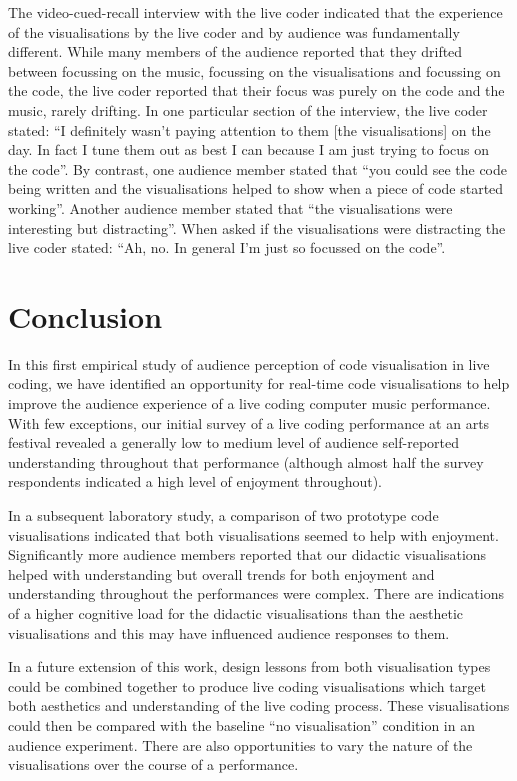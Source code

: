 \documentclass{sig-alternate}
\begin{document}
The video-cued-recall interview with the live coder indicated that the
experience of the visualisations by the live coder and by audience was
fundamentally different. While many members of the audience reported
that they drifted between focussing on the music, focussing on the
visualisations and focussing on the code, the live coder reported that
their focus was purely on the code and the music, rarely drifting. In
one particular section of the interview, the live coder stated: ``I
definitely wasn't paying attention to them [the visualisations] on the
day. In fact I tune them out as best I can because I am just trying to
focus on the code''. By contrast, one audience member stated that
``you could see the code being written and the visualisations helped
to show when a piece of code started working''. Another audience
member stated that ``the visualisations were interesting but
distracting''. When asked if the visualisations were distracting the
live coder stated: ``Ah, no. In general I'm just so focussed on the
code''.

\section{Conclusion}

In this first empirical study of audience perception of code
visualisation in live coding, we have identified an opportunity for
real-time code visualisations to help improve the audience experience
of a live coding computer music performance. With few exceptions, our
initial survey of a live coding performance at an arts festival
revealed a generally low to medium level of audience self-reported
understanding throughout that performance (although almost half the
survey respondents indicated a high level of enjoyment throughout).

In a subsequent laboratory study, a comparison of two prototype code
visualisations indicated that both visualisations seemed to help with
enjoyment. Significantly more audience members reported that our
didactic visualisations helped with understanding but overall trends
for both enjoyment and understanding throughout the performances were
complex. There are indications of a higher cognitive load for the
didactic visualisations than the aesthetic visualisations and this may
have influenced audience responses to them.

In a future extension of this work, design lessons from both
visualisation types could be combined together to produce live coding
visualisations which target both aesthetics and understanding of the
live coding process. These visualisations could then be compared with
the baseline ``no visualisation'' condition in an audience experiment.
There are also opportunities to vary the nature of the visualisations
over the course of a performance.
\end{document}
